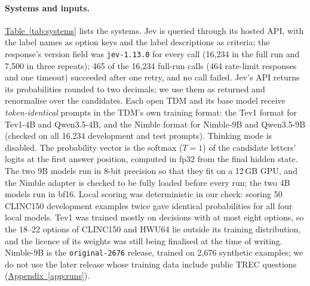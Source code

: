 \paragraph{Systems and inputs.}
\hyperref[tab:systems]{Table~\ref*{tab:systems}} lists the systems. Jev is queried through its hosted API, with the label names as option keys
and the label descriptions as criteria; the response's version field was \texttt{jev-1.13.0} for every call (16{,}234 in the full run and 7{,}500 in
three repeats); 465 of the 16{,}234 full-run calls (464 rate-limit responses and one timeout) succeeded after one
retry, and no call failed. Jev's API returns its probabilities rounded to two decimals; we use them as returned and renormalise over the candidates. Each open TDM and its base model receive \emph{token-identical} prompts
in the TDM's own training format: the Tev1 format for Tev1-4B and Qwen3.5-4B, and the Nimble format for Nimble-9B and
Qwen3.5-9B (checked on all 16{,}234 development and test prompts). Thinking mode is disabled. The probability vector is
the softmax ($T=1$) of the candidate letters' logits at the first answer position, computed in fp32 from the final
hidden state. The two 9B models run in 8-bit precision so that they fit on a 12\,GB GPU, and the Nimble adapter is
checked to be fully loaded before every run; the two 4B models run in bf16. Local scoring was deterministic in our check:
scoring 50 CLINC150 development examples twice gave identical probabilities for all four local models. Tev1 was trained mostly on decisions with at most
eight options, so the 18--22 options of CLINC150 and HWU64 lie outside its training distribution, and the licence of its
weights was still being finalised at the time of writing. Nimble-9B is the \texttt{original-2676} release, trained on
2{,}676 synthetic examples; we do not use the later release whose training data include public TREC questions
(\hyperref[app:runs]{Appendix~\ref*{app:runs}}).

\begin{table}[t]
  \centering
  \caption{\textbf{Each open TDM is paired with its own backbone under identical prompts, readout and precision.}
  Tev1-4B with Qwen3.5-4B (Tev1 prompt format) and Nimble-9B with Qwen3.5-9B (Nimble prompt format, identical 8-bit base
  weights). Revisions are Hugging Face commit hashes. Readout: ``letters'' is the softmax ($T=1$) over the logits of the
  candidate letters at the first answer position; the trained classifiers use a softmax over each example's candidates;
  Jev returns probabilities directly.}
  \label{tab:systems}
  \scriptsize
  \setlength{\tabcolsep}{4pt}
  
\end{table}

